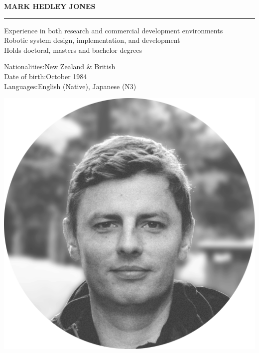\documentclass[english]{extarticle}
\begin{document}
{
    \noindent
    \centering
    \Huge\bfseries \textcolor{primary}{MARK HEDLEY JONES}\\
}
\vspace{3mm}
\textcolor{light}{\hrule}
\vspace{3mm}
\noindent
\begin{minipage}[h]{0.78\textwidth}

    \begin{center}
    \begin{minipage}[t]{1.0\textwidth}
    \large
    Experience in both research and commercial development environments\\
    Robotic system design, implementation, and development\\
    Holds doctoral, masters and bachelor degrees\\
    \end{minipage}
    \end{center}


    \vspace{5mm}

    \noindent\begin{center}\parbox[l]{8cm}{
    {Nationalities:\hfill{\textmd{\small New Zealand}} \& {\textmd{\small British}}}{}\\
    {Date of birth:\hfill{\textmd{\small October 1984}}}{}\\
    {Languages:\hfill{\textmd{\small English (Native), Japanese (N3)}}}
    }\end{center}

\end{minipage}
\noindent
\begin{minipage}[h]{0.18\textwidth}
\vspace{5mm}
\includegraphics[width=1.2\textwidth]{Profile.png}
\end{minipage}
\end{document}
